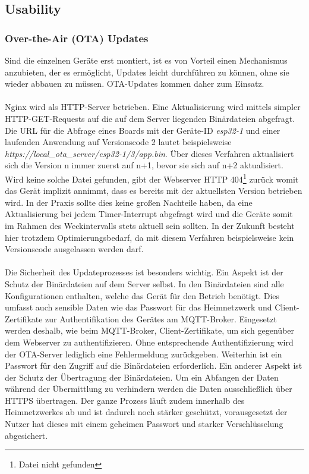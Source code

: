 \documentclass[a4paper,10pt,twocolumn]{article}
\begin{document}
\subsection{Usability} 
\subsubsection{Over-the-Air (OTA) Updates}
Sind die einzelnen Geräte erst montiert, ist es von Vorteil einen Mechanismus anzubieten, der es ermöglicht, Updates leicht durchführen zu können, ohne sie wieder abbauen zu müssen. \ac{OTA}-Updates kommen daher zum Einsatz.\\\\
Nginx wird als \ac{HTTP}-Server betrieben. Eine Aktualisierung wird mittels simpler \ac{HTTP}-GET-Requests auf die auf dem Server liegenden Binärdateien abgefragt. Die URL für die Abfrage eines Boards mit der Geräte-ID \textit{esp32-1} und einer laufenden Anwendung auf Versionscode 2 lautet beispielsweise \mbox{\textit{https://local\_ota\_server/esp32-1/3/app.bin}}. Über dieses Verfahren aktualisiert sich die Version n immer zuerst auf n+1, bevor sie sich auf n+2 aktualisiert. Wird keine solche Datei gefunden, gibt der Webserver \ac{HTTP} 404\footnote{Datei nicht gefunden} zurück womit das Gerät implizit annimmt, dass es bereits mit der aktuellsten Version betrieben wird. In der Praxis sollte dies keine großen Nachteile haben, da eine Aktualisierung bei jedem Timer-Interrupt abgefragt wird und die Geräte somit im Rahmen des Weckintervalls stets aktuell sein sollten. In der Zukunft besteht hier trotzdem Optimierungsbedarf, da mit diesem Verfahren beispielsweise kein Versionscode ausgelassen werden darf.\\\\
Die Sicherheit des Updateprozesses ist besonders wichtig. Ein Aspekt ist der Schutz der Binärdateien auf dem Server selbst. In den Binärdateien sind alle Konfigurationen enthalten, welche das Gerät für den Betrieb benötigt. Dies umfasst auch sensible Daten wie das Passwort für das Heimnetzwerk und Client-Zertifikate zur Authentifikation des Gerätes am \ac{MQTT}-Broker. Eingesetzt werden deshalb, wie beim \ac{MQTT}-Broker, Client-Zertifikate, um sich gegenüber dem Webserver zu authentifizieren. Ohne entsprechende Authentifizierung wird der \ac{OTA}-Server lediglich eine Fehlermeldung zurückgeben. Weiterhin ist ein Passwort für den Zugriff auf die Binärdateien erforderlich. Ein anderer Aspekt ist der Schutz der Übertragung der Binärdateien. Um ein Abfangen der Daten während der Übermittlung zu verhindern werden die Daten ausschließlich über \ac{HTTPS} übertragen. Der ganze Prozess läuft zudem innerhalb des Heimnetzwerkes ab und ist dadurch noch stärker geschützt, vorausgesetzt der Nutzer hat dieses mit einem geheimen Passwort und starker Verschlüsselung abgesichert.
\end{document}
